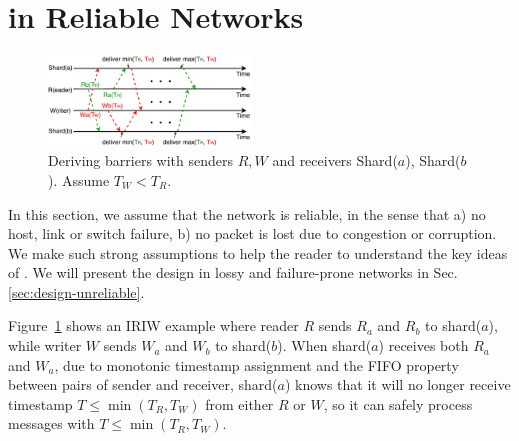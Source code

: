 \section{\sys in Reliable Networks}
\label{sec:design-reliable}

\begin{figure}[t]
\centering
\includegraphics[width=0.48\textwidth]{images/derive_barriers.pdf}
\caption{Deriving barriers with senders $R, W$ and receivers Shard($a$), Shard($b$). Assume $T_W < T_R$.}
\label{fig:barrier}
\vspace{-1em}
\end{figure}

In this section, we assume that the network is reliable, in the sense that a) no host, link or switch failure, b) no packet is lost due to congestion or corruption. We make such strong assumptions to help the reader to understand the key ideas of \sys. We will present the design in lossy and failure-prone networks in Sec.\ref{sec:design-unreliable}.

Figure~\ref{fig:barrier} shows an IRIW example where reader $R$ sends $R_a$ and $R_b$ to shard($a$), while writer $W$ sends $W_a$ and $W_b$ to shard($b$).
When shard($a$) receives both $R_a$ and $W_a$, due to monotonic timestamp assignment and the FIFO property between pairs of sender and receiver, shard($a$) knows that it will no longer receive timestamp $T \leq \min(T_R, T_W)$ from either $R$ or $W$, so it can safely process messages with $T \leq \min(T_R, T_W)$.




